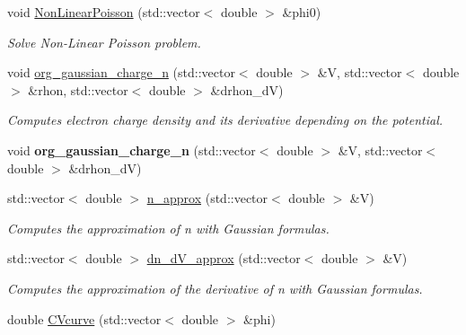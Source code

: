 \begin{DoxyCompactItemize}
void \mbox{\hyperlink{class_probl_a1058c4e0191ea44dcbcd58426247b315}{Non\+Linear\+Poisson}} (std\+::vector$<$ double $>$ \&phi0)
\begin{DoxyCompactList}\small\item\em Solve Non-\/\+Linear Poisson problem. \end{DoxyCompactList}\item 
\mbox{\label{class_probl_a057e578e917c1c45e58988b4f922e164}} 
void \mbox{\hyperlink{class_probl_a057e578e917c1c45e58988b4f922e164}{org\+\_\+gaussian\+\_\+charge\+\_\+n}} (std\+::vector$<$ double $>$ \&V, std\+::vector$<$ double $>$ \&rhon, std\+::vector$<$ double $>$ \&drhon\+\_\+dV)
\begin{DoxyCompactList}\small\item\em Computes electron charge density and its derivative depending on the potential. \end{DoxyCompactList}\item 
\mbox{\label{class_probl_a9c8e936ee0a8ca0323710d5fe7266491}} 
void {\bfseries org\+\_\+gaussian\+\_\+charge\+\_\+n} (std\+::vector$<$ double $>$ \&V, std\+::vector$<$ double $>$ \&drhon\+\_\+dV)
\item 
\mbox{\label{class_probl_aac72244a374b4160cd82d04d5c24d433}} 
std\+::vector$<$ double $>$ \mbox{\hyperlink{class_probl_aac72244a374b4160cd82d04d5c24d433}{n\+\_\+approx}} (std\+::vector$<$ double $>$ \&V)
\begin{DoxyCompactList}\small\item\em Computes the approximation of n with Gaussian formulas. \end{DoxyCompactList}\item 
\mbox{\label{class_probl_a716429c0b4a58817012bc0f5f6250f43}} 
std\+::vector$<$ double $>$ \mbox{\hyperlink{class_probl_a716429c0b4a58817012bc0f5f6250f43}{dn\+\_\+d\+V\+\_\+approx}} (std\+::vector$<$ double $>$ \&V)
\begin{DoxyCompactList}\small\item\em Computes the approximation of the derivative of n with Gaussian formulas. \end{DoxyCompactList}\item 
\mbox{\label{class_probl_ade6c6a86032c185a6043e4bf1c84b120}} 
double \mbox{\hyperlink{class_probl_ade6c6a86032c185a6043e4bf1c84b120}{C\+Vcurve}} (std\+::vector$<$ double $>$ \&phi)

\end{DoxyCompactItemize}
